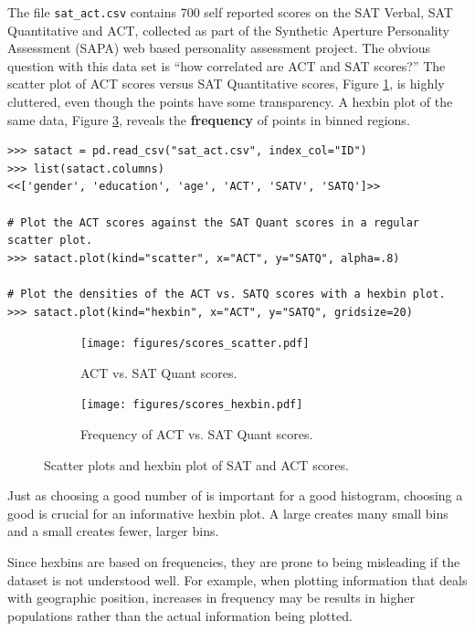 The file \texttt{sat\_act.csv} contains 700 self reported scores on the SAT Verbal, SAT Quantitative and ACT, collected as part of the Synthetic Aperture Personality Assessment (SAPA) web based personality assessment project.
The obvious question with this data set is ``how correlated are ACT and SAT scores?''
The scatter plot of ACT scores versus SAT Quantitative scores, Figure \ref{fig:pandas-act-scatter}, is highly cluttered, even though the points have some transparency.
A hexbin plot of the same data, Figure \ref{fig:pandas-act-hexbin}, reveals the \textbf{frequency} of points in binned regions.

\begin{lstlisting}
>>> satact = pd.read_csv("sat_act.csv", index_col="ID")
>>> list(satact.columns)
<<['gender', 'education', 'age', 'ACT', 'SATV', 'SATQ']>>

# Plot the ACT scores against the SAT Quant scores in a regular scatter plot.
>>> satact.plot(kind="scatter", x="ACT", y="SATQ", alpha=.8)

# Plot the densities of the ACT vs. SATQ scores with a hexbin plot.
>>> satact.plot(kind="hexbin", x="ACT", y="SATQ", gridsize=20)
\end{lstlisting}

\begin{figure}[H]
\captionsetup[subfigure]{justification=centering}
\centering
\begin{subfigure}{.49\textwidth}
    \texttt{[image: figures/scores\_scatter.pdf]}
    \caption{ACT vs. SAT Quant scores.}
    \label{fig:pandas-act-scatter}
\end{subfigure}
%
\begin{subfigure}{.49\textwidth}
    \texttt{[image: figures/scores\_hexbin.pdf]}
    \caption{Frequency of ACT vs. SAT Quant scores.}
    \label{fig:pandas-act-hexbin}
\end{subfigure}
\caption{Scatter plots and hexbin plot of SAT and ACT scores.}
\end{figure}

Just as choosing a good number of  is important for a good histogram, choosing a good  is crucial for an informative hexbin plot.
A large  creates many small bins and a small  creates fewer, larger bins.

\begin{info}
Since hexbins are based on frequencies, they are prone to being misleading if the dataset is not understood well. For example, when plotting information that deals with geographic position, increases in frequency may be results in higher populations rather than the actual information being plotted.

\end{info}

